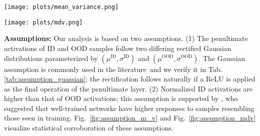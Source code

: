 \documentclass{article} %
\theoremstyle{plain}
\begin{document}
\vspace{2em}

\begin{minipage}[t!]{0.30\textwidth}
\vspace{-5em}
\centering
{}
  \label{tab:assumption_guassian}
\end{minipage}
\hfill
\begin{minipage}[t]{0.33\textwidth}

\texttt{[image: plots/mean\_variance.png]}
\label{fig:assumption_m_v}
  
\end{minipage}
\hfill
\begin{minipage}[t]{0.33\textwidth}

    \texttt{[image: plots/mdv.png]}
    \label{fig:assumption_mdv}

\end{minipage}

\vspace{1em}
\textbf{Assumptions:} Our analysis is based on two assumptions.  (1) The penultimate activations of ID and OOD samples follow two differing rectified Gaussian distributions parameterized by $(\mu^{\text{ID}}, \sigma^{\text{ID}})$ and  $(\mu^{\text{OOD}}, \sigma^{\text{OOD}})$. The Gaussian assumption is commonly used in the literature~\citep{DBLP:conf/nips/SunGL21/ReAct}and we verify it in Tab. \ref{tab:assumption_guassian}; the rectification follows naturally if a ReLU is applied as the final operation of the penultimate layer.  (2) Normalized ID activations are higher than that of OOD activations; this assumption is supported by \citep{DBLP:conf/nips/LiuWOL20/EBO}
, who suggested that well-trained networks have higher responses to samples resembling those seen in training.
Fig.~\ref{fig:assumption_m_v} and Fig.~\ref{fig:assumption_mdv} visualize statistical corroboration of these assumptions. 
\end{document}
